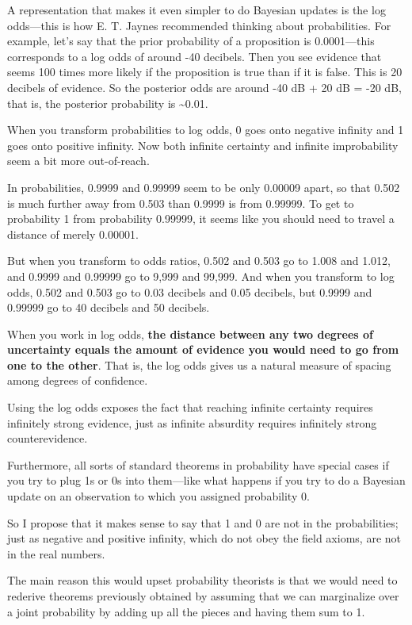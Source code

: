 {
 A representation that makes it even simpler to do Bayesian updates
is the log odds---this is how E. T. Jaynes recommended thinking about
probabilities. For example, let's say that the prior
probability of a proposition is 0.0001---this corresponds to a log odds
of around -40 decibels. Then you see evidence that seems 100 times more
likely if the proposition is true than if it is false. This is 20
decibels of evidence. So the posterior odds are around -40 dB + 20 dB =
-20 dB, that is, the posterior probability is \~{}0.01.}

{
 When you transform probabilities to log odds, 0 goes onto negative
infinity and 1 goes onto positive infinity. Now both infinite certainty
and infinite improbability seem a bit more out-of-reach.}

{
 In probabilities, 0.9999 and 0.99999 seem to be only 0.00009
apart, so that 0.502 is much further away from 0.503 than 0.9999 is
from 0.99999. To get to probability 1 from probability 0.99999, it
seems like you should need to travel a distance of merely 0.00001.}

{
 But when you transform to odds ratios, 0.502 and 0.503 go to 1.008
and 1.012, and 0.9999 and 0.99999 go to 9,999 and 99,999. And when you
transform to log odds, 0.502 and 0.503 go to 0.03 decibels and 0.05
decibels, but 0.9999 and 0.99999 go to 40 decibels and 50 decibels.}

{
 When you work in log odds, \textbf{the distance between any two
degrees of uncertainty equals the amount of evidence you would need to
go from one to the other}. That is, the log odds gives us a natural
measure of spacing among degrees of confidence.}

{
 Using the log odds exposes the fact that reaching infinite
certainty requires infinitely strong evidence, just as infinite
absurdity requires infinitely strong counterevidence.}

{
 Furthermore, all sorts of standard theorems in probability have
special cases if you try to plug 1s or 0s into them---like what happens
if you try to do a Bayesian update on an observation to which you
assigned probability 0.}

{
 So I propose that it makes sense to say that 1 and 0 are not in
the probabilities; just as negative and positive infinity, which do not
obey the field axioms, are not in the real numbers.}

{
 The main reason this would upset probability theorists is that we
would need to rederive theorems previously obtained by assuming that we
can marginalize over a joint probability by adding up all the pieces
and having them sum to 1.}

